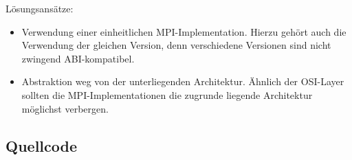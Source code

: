 \documentclass[a4paper,
12pt,
BCOR12mm,
]{scrartcl}
\begin{document}
Lösungsansätze:
\begin{itemize}
	\item Verwendung einer einheitlichen MPI-Implementation. Hierzu gehört auch die
		Verwendung der gleichen Version, denn verschiedene Versionen sind nicht zwingend
		ABI-kompatibel.
	\item Abstraktion weg von der unterliegenden Architektur. Ähnlich der OSI-Layer sollten
	die MPI-Implementationen die zugrunde liegende Architektur möglichst verbergen.
\end{itemize}

\nocite{*}

%
\newpage
\subsection*{Quellcode}

\newpage

\newpage

\newpage

\newpage

\newpage

\end{document}
